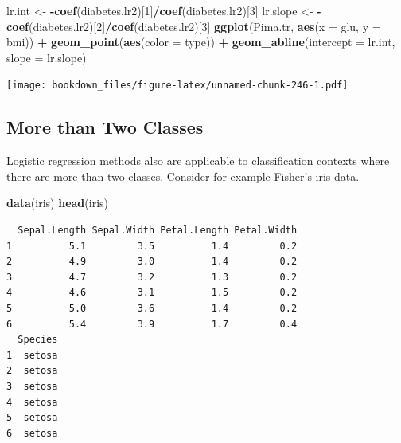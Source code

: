 \documentclass[
]{krantz}
\makeatletter
\newenvironment{Shaded}{\begin{snugshade}}{\end{snugshade}}
\newcommand{\DataTypeTok}[1]{\textcolor[rgb]{0.27,0.27,0.27}{#1}}
\newcommand{\DecValTok}[1]{\textcolor[rgb]{0.06,0.06,0.06}{#1}}
\newcommand{\KeywordTok}[1]{\textcolor[rgb]{0.27,0.27,0.27}{\textbf{#1}}}
\newcommand{\NormalTok}[1]{#1}
\newcommand{\OperatorTok}[1]{\textcolor[rgb]{0.43,0.43,0.43}{\textbf{#1}}}
\newcommand{\StringTok}[1]{\textcolor[rgb]{0.5,0.5,0.5}{#1}}
\newenvironment{kframe}{%
\medskip{}
\setlength{\fboxsep}{.8em}
 \def\at@end@of@kframe{}%
 \ifinner\ifhmode%
  \def\at@end@of@kframe{\end{minipage}}%
  \begin{minipage}{\columnwidth}%
 \fi\fi%
 \def\FrameCommand##1{\hskip\@totalleftmargin \hskip-\fboxsep
 \colorbox{shadecolor}{##1}\hskip-\fboxsep
     \hskip-\linewidth \hskip-\@totalleftmargin \hskip\columnwidth}%
 \MakeFramed {\advance\hsize-\width
   \@totalleftmargin\z@ \linewidth\hsize
   \@setminipage}}%
 {\par\unskip\endMakeFramed%
 \at@end@of@kframe}
\renewenvironment{Shaded}{\begin{kframe}}{\end{kframe}}
\makeatother
\begin{document}
\begin{Shaded}
\begin{Highlighting}[]
\NormalTok{lr.int \textless{}{-}}\StringTok{ }\OperatorTok{{-}}\KeywordTok{coef}\NormalTok{(diabetes.lr2)[}\DecValTok{1}\NormalTok{]}\OperatorTok{/}\KeywordTok{coef}\NormalTok{(diabetes.lr2)[}\DecValTok{3}\NormalTok{]}
\NormalTok{lr.slope \textless{}{-}}\StringTok{ }\OperatorTok{{-}}\KeywordTok{coef}\NormalTok{(diabetes.lr2)[}\DecValTok{2}\NormalTok{]}\OperatorTok{/}\KeywordTok{coef}\NormalTok{(diabetes.lr2)[}\DecValTok{3}\NormalTok{]}
\KeywordTok{ggplot}\NormalTok{(Pima.tr, }\KeywordTok{aes}\NormalTok{(}\DataTypeTok{x =}\NormalTok{ glu, }\DataTypeTok{y =}\NormalTok{ bmi)) }\OperatorTok{+}\StringTok{ }
\StringTok{  }\KeywordTok{geom\_point}\NormalTok{(}\KeywordTok{aes}\NormalTok{(}\DataTypeTok{color =}\NormalTok{ type)) }\OperatorTok{+}\StringTok{ }
\StringTok{  }\KeywordTok{geom\_abline}\NormalTok{(}\DataTypeTok{intercept =}\NormalTok{ lr.int, }\DataTypeTok{slope =}\NormalTok{ lr.slope)}
\end{Highlighting}
\end{Shaded}

\texttt{[image: bookdown\_files/figure-latex/unnamed-chunk-246-1.pdf]}

\hypertarget{more-than-two-classes}{%
\subsection{More than Two Classes}\label{more-than-two-classes}}

Logistic regression methods also are applicable to classification contexts where there are more than two classes. Consider for example Fisher's iris data.

\begin{Shaded}
\begin{Highlighting}[]
\KeywordTok{data}\NormalTok{(iris)}
\KeywordTok{head}\NormalTok{(iris)}
\end{Highlighting}
\end{Shaded}

\begin{verbatim}
  Sepal.Length Sepal.Width Petal.Length Petal.Width
1          5.1         3.5          1.4         0.2
2          4.9         3.0          1.4         0.2
3          4.7         3.2          1.3         0.2
4          4.6         3.1          1.5         0.2
5          5.0         3.6          1.4         0.2
6          5.4         3.9          1.7         0.4
  Species
1  setosa
2  setosa
3  setosa
4  setosa
5  setosa
6  setosa
\end{verbatim}
\end{document}
